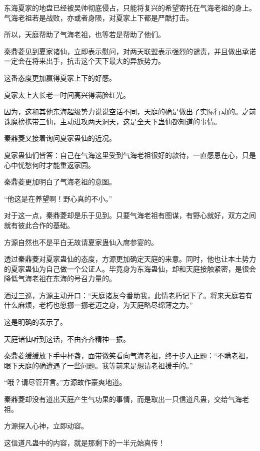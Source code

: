\begin{this_body}
东海夏家的地盘已经被吴帅彻底侵占，只能将复兴的希望寄托在气海老祖的身上。气海老祖若是战败，亦或者身陨，对夏家上下都是严酷打击。

所以，天庭帮助了气海老祖，也等若是帮助了他们。

秦鼎菱见到夏家诸仙，立即表示慰问，对两天联盟表示强烈的谴责，并且做出承诺一定会在将来出手，抗击这个天下最大的异族势力。

这番态度更加赢得夏家上下的好感。

夏家太上大长老一时间高兴得满脸红光。

因为，这和其他东海超级势力说说空话不同，天庭的确是做出了实际行动的。之前诛魔榜携带三仙，主动进攻两天洞天，这是全天下蛊仙都知道的事情。

秦鼎菱又接着询问夏家蛊仙的近况。

夏家蛊仙们皆答：自己在气海这里受到气海老祖很好的款待，一直感恩在心，只是心中忧愁何时才能重返家园。

秦鼎菱更加明白了气海老祖的意图。

“他这是在养望啊！野心真的不小。”

对于这一点，秦鼎菱却是乐于见到。只要气海老祖有图谋，有野心就好，双方之间就有彼此合作的基础。

方源自然也不是平白无故请夏家蛊仙入席参宴的。

透过秦鼎菱对夏家蛊仙的态度，方源更加确定天庭的来意。同时，他也让本土势力的夏家蛊仙为自己做一个公证人。毕竟身为东海蛊仙，却和天庭接触紧密，是很会降低气海老祖在东海的号召力量的。

酒过三巡，方源主动开口：“天庭诸友今番助我，此情老朽记下了。将来天庭若有什么麻烦，老朽也愿挪一挪老迈之身，为天庭略尽绵薄之力。”

这是明确的表示了。

天庭诸仙听到这话，不由齐齐精神一振。

秦鼎菱缓缓放下手中杯盏，面带微笑看向气海老祖，终于步入正题：“不瞒老祖，眼下天庭的确遭遇了一些问题。我等前来是想请老祖援手的。”

“哦？请尽管开言。”方源故作豪爽地道。

秦鼎菱却没有道出天庭产生气功果的事情，而是取出一只信道凡蛊，交给气海老祖。

方源探入心神，立即动容。

这信道凡蛊中的内容，就是那剩下的一半元始真传！

\end{this_body}

